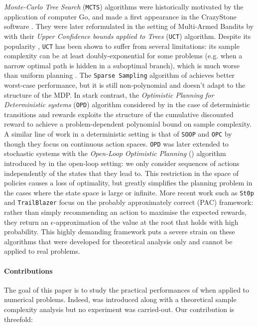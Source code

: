 \documentclass[runningheads, envcountsame, a4paper]{llncs}
\newcommand{\citep}{\cite}
\newcommand{\citet}{\cite}
\begin{document}
\emph{Monte-Carlo Tree Search} (\texttt{MCTS}) algorithms were historically motivated by the application of computer Go, and made a first appearance in the CrazyStone software \citet{Coulom2006}. They were later reformulated in the setting of Multi-Armed Bandits by \citet{Kocsis2006} with their \emph{Upper Confidence bounds applied to Trees} (\texttt{UCT}) algorithm. Despite its popularity \citep{Silver2016,Silver2017,Silver2018}, \texttt{UCT} has been shown to suffer from several limitations: its sample complexity can be at least doubly-exponential for some problems (e.g. when a narrow optimal path is hidden in a suboptimal branch), which is much worse than uniform planning \citep{Coquelin2007}. The \texttt{Sparse Sampling} algorithm of \citet{Kearns2002} achieves better worst-case performance, but it is still non-polynomial and doesn't adapt to the structure of the MDP. In stark contrast, the \emph{Optimistic Planning for Deterministic systems} (\texttt{OPD}) algorithm considered by \citet{Hren2008} in the case of deterministic transitions and rewards exploits the structure of the cumulative discounted reward to achieve a problem-dependent polynomial bound on sample complexity. A similar line of work in a deterministic setting is that of \texttt{SOOP} and \texttt{OPC} by \cite{Busoniu2013,Busoniu2018} though they focus on continuous action spaces. \texttt{OPD} was later extended to stochastic systems with the \emph{Open-Loop Optimistic Planning} (\OLOP) algorithm introduced by \citet{Bubeck2010} in the open-loop setting: we only consider sequences of actions independently of the states that they lead to. This restriction in the space of policies causes a loss of optimality, but greatly simplifies the planning problem in the cases where the state space is large or infinite. More recent work such as \texttt{St0p} \citep{Szorenyi2014} and \texttt{TrailBlazer} \citep{Grill2016} focus on the probably approximately correct (PAC) framework: rather than simply recommending an action to maximise the expected rewards, they return an $\epsilon$-approximation of the value at the root that holds with high probability. This highly demanding framework puts a severe strain on these algorithms that were developed for theoretical analysis only and cannot be applied to real problems.

\paragraph{Contributions} The goal of this paper is to study the practical performances of \OLOP when applied to numerical problems. Indeed, \OLOP was introduced along with a theoretical sample complexity analysis but no experiment was carried-out. Our contribution is threefold:
\end{document}
